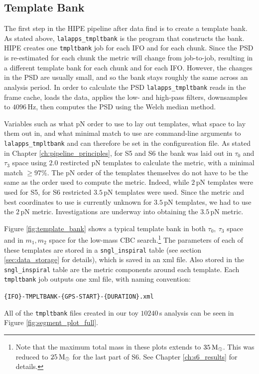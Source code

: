 \subsection{Template Bank}
\label{sec:tmpltbank}

The first step in the \ac{HIPE} pipeline after data find is to create a template bank. As stated above, \texttt{lalapps\_tmpltbank} is the program that constructs the bank. \ac{HIPE} creates one \texttt{tmpltbank} job for each \ac{IFO} and for each chunk. Since the \ac{PSD} is re-estimated for each chunk the metric will change from job-to-job, resulting in a different template bank for each chunk and for each \ac{IFO}. However, the changes in the \ac{PSD} are usually small, and so the bank stays roughly the same across an analysis period. In order to calculate the \ac{PSD} \texttt{lalapps\_tmpltbank} reads in the frame cache, loads the data, applies the low- and high-pass filters, downsamples to $4096\,$Hz, then computes the \ac{PSD} using the Welch median method.

Variables such as what \ac{pN} order to use to lay out templates, what space to lay them out in, and what minimal match to use are command-line arguments to \texttt{lalapps\_tmpltbank} and can therefore be set in the configureation file. As stated in Chapter \ref{ch:pipeline_principles}, for \ac{S5} and \ac{S6} the bank was laid out in $\tau_0$ and $\tau_3$ space using $2.0$ restircted \ac{pN} templates to calculate the metric, with a minimal match $\geq 97\%$. The \ac{pN} order of the templates themselves do not have to be the same as the order used to compute the metric. Indeed, while $2\,$\ac{pN} templates were used for \ac{S5}, for \ac{S6} restricted $3.5\,$\ac{pN} templates were used. Since the metric and best coordinates to use is currently unknown for $3.5\,$\ac{pN} templates, we had to use the $2\,$\ac{pN} metric. Investigations are underway into obtaining the $3.5\,$\ac{pN} metric.

Figure \ref{fig:template_bank} shows a typical template bank in both $\tau_0,~\tau_3$ space and in $m_1,m_2$ space for the low-mass \ac{CBC} search.\footnote{Note that the maximum total mass in these plots extends to $35\,\mathrm{M_\odot}$. This was reduced to $25\,\mathrm{M_\odot}$ for the last part of \ac{S6}. See Chapter \ref{ch:s6_results} for details.} The parameters of each of these templates are stored in a \texttt{sngl\_inspiral} table (see section \ref{sec:data_storage} for details), which is saved in an xml file. Also stored in the \texttt{sngl\_inspiral} table are the metric components around each template. Each \texttt{tmpltbank} job outputs one xml file, with naming convention:
\begin{center}
\texttt{\{IFO\}-TMPLTBANK-\{GPS-START\}-\{DURATION\}.xml}
\end{center}
All of the \texttt{tmpltbank} files created in our toy $10240\,$s analysis can be seen in Figure \ref{fig:segment_plot_full}.

